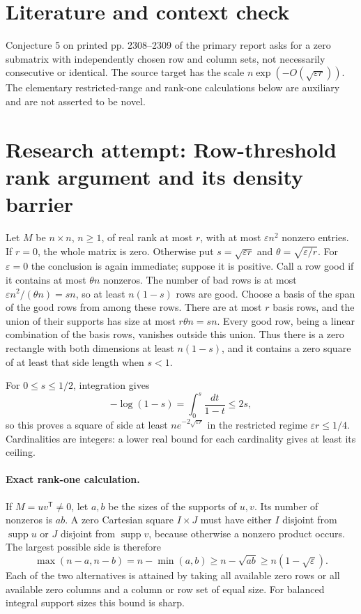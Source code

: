 \documentclass[11pt]{article}
\begin{document}
\section{Literature and context check}
Conjecture 5 on printed pp. 2308--2309 of the primary report asks for a zero submatrix with independently chosen row and column sets, not necessarily consecutive or identical. The source target has the scale $n\exp(-O(\sqrt{\varepsilon r}))$. The elementary restricted-range and rank-one calculations below are auxiliary and are not asserted to be novel.
\section{Research attempt: Row-threshold rank argument and its density barrier}

Let $M$ be $n\times n$, $n\geq1$, of real rank at most $r$, with at most $\varepsilon n^2$ nonzero entries. If $r=0$, the whole matrix is zero. Otherwise put $s=\sqrt{\varepsilon r}$ and $\theta=\sqrt{\varepsilon/r}$. For $\varepsilon=0$ the conclusion is again immediate; suppose it is positive. Call a row good if it contains at most $\theta n$ nonzeros. The number of bad rows is at most $\varepsilon n^2/(\theta n)=sn$, so at least $n(1-s)$ rows are good. Choose a basis of the span of the good rows from among these rows. There are at most $r$ basis rows, and the union of their supports has size at most $r\theta n=sn$. Every good row, being a linear combination of the basis rows, vanishes outside this union. Thus there is a zero rectangle with both dimensions at least $n(1-s)$, and it contains a zero square of at least that side length when $s<1$.

For $0\leq s\leq1/2$, integration gives
\[
-\log(1-s)=\int_0^s\frac{dt}{1-t}\leq2s,
\]
so this proves a square of side at least $ne^{-2\sqrt{\varepsilon r}}$ in the restricted regime $\varepsilon r\leq1/4$. Cardinalities are integers: a lower real bound for each cardinality gives at least its ceiling.

\paragraph{Exact rank-one calculation.}
If $M=uv^{\mathsf T}\ne0$, let $a,b$ be the sizes of the supports of $u,v$. Its number of nonzeros is $ab$. A zero Cartesian square $I\times J$ must have either $I$ disjoint from $\operatorname{supp}u$ or $J$ disjoint from $\operatorname{supp}v$, because otherwise a nonzero product occurs. The largest possible side is therefore
\[
\max(n-a,n-b)=n-\min(a,b)\geq n-\sqrt{ab}\geq n(1-\sqrt\varepsilon).
\]
Each of the two alternatives is attained by taking all available zero rows or all available zero columns and a column or row set of equal size. For balanced integral support sizes this bound is sharp.
\end{document}
